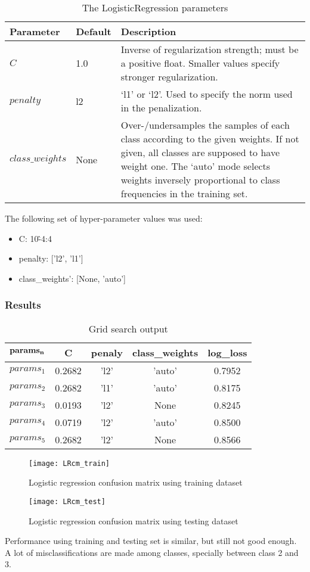 \begin{table}[h!]
	\caption{The LogisticRegression parameters}
	\begin{tabular}{ | l | l | p{7cm} |}
		\hline
		\textbf{Parameter} & \textbf{Default} & \textbf{Description}\\
		\hline
		$C$ & 1.0 & Inverse of regularization strength; must be a positive float. Smaller values specify stronger regularization.\\
		\hline
		$penalty$ & l2 & ‘l1’ or ‘l2’. Used to specify the norm used in the penalization.\\
		\hline
		$class\_weights$ & None & Over-/undersamples the samples of each class according to the given weights. If not given, all classes are supposed to have weight one. The ‘auto’ mode selects weights inversely proportional to class frequencies in the training set.\\
		\hline
	\end{tabular}
	\label{table:LRdefaults}
\end{table}
The following set of hyper-parameter values was used:
\begin{itemize}
	\item C: 10\^-4:4
	\item penalty: ['l2', 'l1']
	\item class\_weights': [None, 'auto']
\end{itemize}
\subsubsection{Results}
\begin{table}[h!]
	\centering
	\caption{Grid search output}
	\begin{tabular}{ | l | c | c | c | c |}
		\hline
		$\bf{params_n}$ & \bf{C} &  \bf{penaly} & \bf{class\_weights} & \bf{log\_loss} \\ \hline
		$params_1$ & 0.2682 & 'l2' & 'auto' & 0.7952 \\ \hline
		$params_2$ & 0.2682 & 'l1' & 'auto' & 0.8175 \\ \hline
		$params_3$ & 0.0193 & 'l2' & None & 0.8245\\ \hline
		$params_4$ & 0.0719 & 'l2' & 'auto' & 0.8500 \\ \hline
		$params_5$ & 0.2682 & 'l2' & None & 0.8566 \\ \hline
	\end{tabular}
	\label{table:LR_gs}
\end{table}
\vspace{2mm}
\begin{figure}[h!]
	\centering
	\texttt{[image: LRcm\_train]}
	\caption{Logistic regression confusion matrix using training dataset}
	\label{fig:LRcm_train}
\end{figure}
\begin{figure}[h!]
	\centering
	\texttt{[image: LRcm\_test]}
	\caption{Logistic regression confusion matrix using testing dataset}
	\label{fig:LRcm_test}
\end{figure}
Performance using training and testing set is similar, but still not good enough. A lot of misclassifications are made among classes, specially between class 2 and 3.